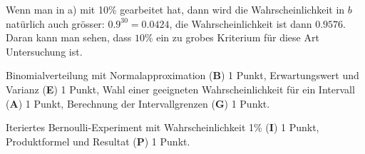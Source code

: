 \begin{loesung}
\begin{teilaufgaben}
Wenn man in a) mit 10\% gearbeitet hat, dann wird die Wahrscheinlichkeit in
$b$ natürlich auch grösser: $0.9^{30}=0.0424$, die Wahrscheinlichkeit ist
dann $0.9576$. Daran kann man sehen, dass $10\%$ ein zu grobes Kriterium
für diese Art Untersuchung ist.
\qedhere
\end{teilaufgaben}
\end{loesung}

\begin{bewertung}
\begin{teilaufgaben}
\item Binomialverteilung mit Normalapproximation ({\bf B}) 1 Punkt,
Erwartungswert und Varianz ({\bf E}) 1 Punkt,
Wahl einer geeigneten Wahrscheinlichkeit für ein Intervall ({\bf A}) 1 Punkt,
Berechnung der Intervallgrenzen ({\bf G}) 1 Punkt.
\item Iteriertes Bernoulli-Experiment mit Wahrscheinlichkeit 1\% ({\bf I})
1 Punkt,
Produktformel und Resultat ({\bf P}) 1 Punkt.
\end{teilaufgaben}
\end{bewertung}


